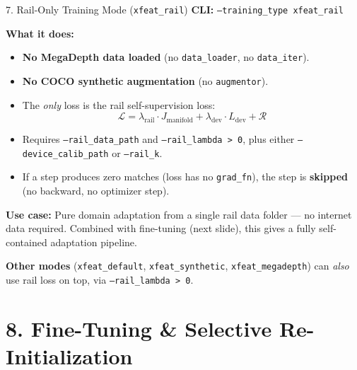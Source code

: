 \documentclass[aspectratio=169, 12pt]{beamer}
\begin{document}
\begin{frame}{7. Rail-Only Training Mode (\texttt{xfeat\_rail})}
\small
\textbf{CLI:} \texttt{--training\_type xfeat\_rail}

\medskip
\textbf{What it does:}
\begin{itemize}\setlength{\itemsep}{3pt}
    \item \textbf{No MegaDepth data loaded} (no \texttt{data\_loader}, no \texttt{data\_iter}).
    \item \textbf{No COCO synthetic augmentation} (no \texttt{augmentor}).
    \item The \emph{only} loss is the rail self-supervision loss:
    \[
        \mathcal{L} = \lambda_{\mathrm{rail}} \cdot J_{\mathrm{manifold}}
        + \lambda_{\mathrm{dev}} \cdot L_{\mathrm{dev}} + \mathcal{R}
    \]
    \item Requires \texttt{--rail\_data\_path} and \texttt{--rail\_lambda > 0},
          plus either \texttt{--device\_calib\_path} or \texttt{--rail\_k}.
    \item If a step produces zero matches (loss has no \texttt{grad\_fn}),
          the step is \textbf{skipped} (no backward, no optimizer step).
\end{itemize}

\medskip
\textbf{Use case:} Pure domain adaptation from a single rail data folder ---
no internet data required.  Combined with fine-tuning (next slide), this gives
a fully self-contained adaptation pipeline.

\medskip
\textbf{Other modes} (\texttt{xfeat\_default}, \texttt{xfeat\_synthetic}, \texttt{xfeat\_megadepth})
can \emph{also} use rail loss on top, via \texttt{--rail\_lambda > 0}.
\end{frame}


\section{8. Fine-Tuning \& Selective Re-Initialization}
\end{document}
